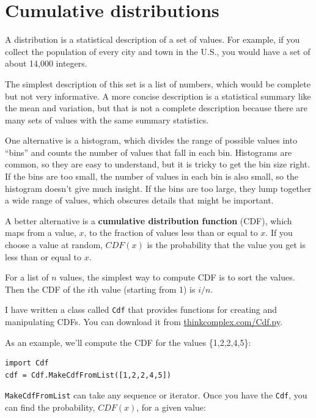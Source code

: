 \documentclass[10pt]{book}
\begin{document}
\section{Cumulative distributions}

A distribution is a statistical description of a set of values.
For example, if you collect the population of every city and town
in the U.S., you would have a set of about 14,000 integers.

The simplest description of this set is a list of numbers, which
would be complete but not very informative.  A more concise description
is a statistical summary like the mean and variation, but
that is not a complete description because there are many sets
of values with the same summary statistics.

One alternative is a histogram, which divides the range of
possible values into ``bins'' and counts the number of values that
fall in each bin.  Histograms are common, so they are
easy to understand, but it is tricky to get the bin size right.  If the bins
are too small, the number of values in each bin is also small,
so the histogram doesn't give much insight.  If the bins are
too large, they lump together a wide range of values, which
obscures details that might be important.  

A better alternative is a {\bf cumulative distribution function}
(CDF), which maps from a value, $x$, to the fraction of values less
than or equal to $x$.  If you choose a value at random, $CDF(x)$
is the probability that the value you get is less
than or equal to $x$.

For a list of $n$ values, the simplest way to compute CDF is to
sort the values.  Then the CDF of the $i$th value (starting from 1)
is $i/n$.

I have written a class called {\tt Cdf} that provides functions
for creating and manipulating CDFs.  You can download it from
\url{thinkcomplex.com/Cdf.py}.

As an example, we'll compute the CDF for the values \{1,2,2,4,5\}:

\begin{verbatim}
import Cdf
cdf = Cdf.MakeCdfFromList([1,2,2,4,5])
\end{verbatim}

{\tt MakeCdfFromList} can take any sequence or iterator.
Once you have the {\tt Cdf}, you can find the probability, $CDF(x)$, for
a given value:
\end{document}
